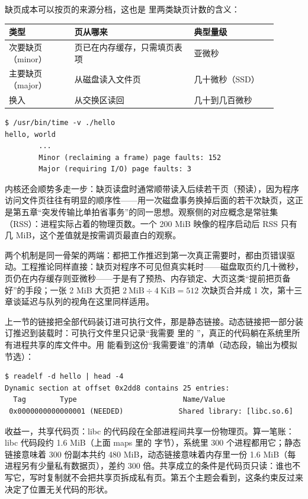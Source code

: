 缺页成本可以按页的来源分档，这也是  里两类缺页计数的含义：

\begin{longtable}{L{0.22\linewidth}L{0.40\linewidth}L{0.28\linewidth}}
\toprule
类型 & 页从哪来 & 典型量级 \\
\midrule
次要缺页（minor） & 页已在内存缓存，只需填页表项 & 亚微秒 \\
主要缺页（major） & 从磁盘读入文件页 & 几十微秒（SSD） \\
换入 & 从交换区读回 & 几十到几百微秒 \\
\bottomrule
\end{longtable}

\begin{lstlisting}
$ /usr/bin/time -v ./hello
hello, world
        ...
        Minor (reclaiming a frame) page faults: 152
        Major (requiring I/O) page faults: 3
\end{lstlisting}

内核还会顺势多走一步：缺页读盘时通常顺带读入后续若干页（预读），因为程序访问文件页往往有明显的顺序性——用一次磁盘事务换掉后面的若干次缺页，这正是第五章“突发传输比单拍省事务”的同一思想。观察侧的对应概念是常驻集（RSS）：进程实际占着的物理页数。一个 200 MiB 映像的程序启动后 RSS 只有几 MiB，这个差值就是按需调页最直白的观察。

两个机制是同一骨架的两端：都把工作推迟到第一次真正需要时，都由页错误驱动。工程推论同样直接：缺页对程序不可见但真实耗时——磁盘取页约几十微秒，页仍在内存缓存则亚微秒——于是有了预热、内存锁定、大页这类“提前把页备好”的手段；一张 2 MiB 大页把 $2\ \text{MiB}\div4\ \text{KiB}=512$ 次缺页合并成 1 次，第十三章谈延迟与队列的视角在这里同样适用。

上一节的链接把全部代码装订进可执行文件，那是静态链接。动态链接把一部分装订推迟到装载时：可执行文件里只记录“我需要  里的 ”，真正的代码躺在系统里所有进程共享的库文件中。用  能看到这份“我需要谁”的清单（动态段，输出为模拟节选）：

\begin{lstlisting}
$ readelf -d hello | head -4
Dynamic section at offset 0x2dd8 contains 25 entries:
  Tag        Type                         Name/Value
 0x0000000000000001 (NEEDED)             Shared library: [libc.so.6]
\end{lstlisting}

收益一，共享代码页：libc 的代码段在全部进程间共享一份物理页。算一笔账：libc 代码段约 1.6 MiB（上面 maps 里的  字节），系统里 300 个进程都用它；静态链接意味着 300 份副本共约 480 MiB，动态链接意味着内存里一份 1.6 MiB（每进程另有少量私有数据页），差约 300 倍。共享成立的条件是代码页只读：谁也不写它，写时复制就不会把共享页拆成私有页。第五个主题会看到，这条约束反过来决定了位置无关代码的形状。

